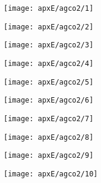 \begin{figure}[H]
\centering

\texttt{[image: apxE/agco2/1]}

\end{figure}

\begin{figure}[H]
\centering

\texttt{[image: apxE/agco2/2]}

\end{figure}

\begin{figure}[H]
\centering

\texttt{[image: apxE/agco2/3]}

\end{figure}

\begin{figure}[H]
\centering

\texttt{[image: apxE/agco2/4]}

\end{figure}

\begin{figure}[H]
\centering

\texttt{[image: apxE/agco2/5]}

\end{figure}

\begin{figure}[H]
\centering

\texttt{[image: apxE/agco2/6]}

\end{figure}

\begin{figure}[H]
\centering

\texttt{[image: apxE/agco2/7]}

\end{figure}

\begin{figure}[H]
\centering

\texttt{[image: apxE/agco2/8]}

\end{figure}

\begin{figure}[H]
\centering

\texttt{[image: apxE/agco2/9]}

\end{figure}

\begin{figure}[H]
\centering

\texttt{[image: apxE/agco2/10]}

\end{figure}